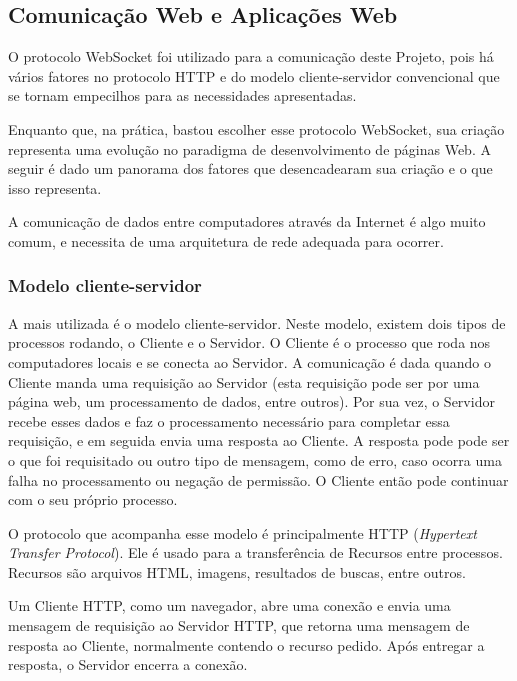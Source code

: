 \documentclass[a4paper,12pt]{article}
\begin{document}
\subsection{Comunicação Web e Aplicações Web}


O protocolo WebSocket foi utilizado para a comunicação deste Projeto, pois há vários fatores no protocolo HTTP e do modelo cliente-servidor convencional que se tornam empecilhos para as necessidades apresentadas.

Enquanto que, na prática, bastou escolher esse protocolo WebSocket, sua criação representa uma evolução no paradigma de desenvolvimento de páginas Web. A seguir é dado um panorama dos fatores que desencadearam sua criação e o que isso representa.

A comunicação de dados entre computadores através da Internet é algo muito comum, e necessita de uma arquitetura de rede adequada para ocorrer.

\subsubsection{Modelo cliente-servidor}
A mais utilizada é o modelo cliente-servidor. Neste modelo, existem dois tipos de processos rodando, o Cliente e o Servidor. O Cliente é o processo que roda nos computadores locais e se conecta ao Servidor. A comunicação é dada quando o Cliente manda uma requisição ao Servidor (esta requisição pode ser por uma página web, um processamento de dados, entre outros). Por sua vez, o Servidor recebe esses dados e faz o processamento necessário para completar essa requisição, e em seguida envia uma resposta ao Cliente. A resposta pode pode ser o que foi requisitado ou outro tipo de mensagem, como de erro, caso ocorra uma falha no processamento ou negação de permissão. O Cliente então pode continuar com o seu próprio processo.



O protocolo que acompanha esse modelo é principalmente HTTP (\emph{Hypertext Transfer Protocol}). Ele é usado para a transferência de Recursos entre processos. Recursos são arquivos HTML, imagens, resultados de buscas, entre outros.

Um Cliente HTTP, como um navegador, abre uma conexão e envia uma mensagem de requisição ao Servidor HTTP, que retorna uma mensagem de resposta ao Cliente, normalmente contendo o recurso pedido. Após entregar a resposta, o Servidor encerra a conexão.
\end{document}
